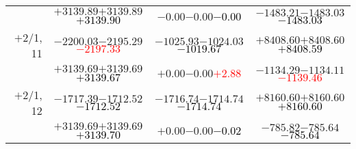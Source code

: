 \documentclass[compress]{beamer}
\begin{document}
\begin{frame}
{\begin{tabular}{r | c | c | c}
           & $+3139.89$\hspace{0.1 cm}$+3139.89$\hspace{0.1 cm}\textcolor{black}{$+3139.90$} & $-0.00$\hspace{0.1 cm}$-0.00$\hspace{0.1 cm}\textcolor{black}{$-0.00$} & $-1483.21$\hspace{0.1 cm}$-1483.03$\hspace{0.1 cm}\textcolor{black}{$-1483.03$} \\
$+$2/1, 11 & $-2200.03$\hspace{0.1 cm}$-2195.29$\hspace{0.1 cm}\textcolor{red}{$-2197.33$} & $-1025.93$\hspace{0.1 cm}$-1024.03$\hspace{0.1 cm}\textcolor{black}{$-1019.67$} & $+8408.60$\hspace{0.1 cm}$+8408.60$\hspace{0.1 cm}\textcolor{black}{$+8408.59$} \\
           & $+3139.69$\hspace{0.1 cm}$+3139.69$\hspace{0.1 cm}\textcolor{black}{$+3139.67$} & $+0.00$\hspace{0.1 cm}$-0.00$\hspace{0.1 cm}\textcolor{red}{$+2.88$} & $-1134.29$\hspace{0.1 cm}$-1134.11$\hspace{0.1 cm}\textcolor{red}{$-1139.46$} \\
$+$2/1, 12 & $-1717.39$\hspace{0.1 cm}$-1712.52$\hspace{0.1 cm}\textcolor{black}{$-1712.52$} & $-1716.74$\hspace{0.1 cm}$-1714.74$\hspace{0.1 cm}\textcolor{black}{$-1714.74$} & $+8160.60$\hspace{0.1 cm}$+8160.60$\hspace{0.1 cm}\textcolor{black}{$+8160.60$} \\
           & $+3139.69$\hspace{0.1 cm}$+3139.69$\hspace{0.1 cm}\textcolor{black}{$+3139.70$} & $+0.00$\hspace{0.1 cm}$-0.00$\hspace{0.1 cm}\textcolor{black}{$-0.02$} & $-785.82$\hspace{0.1 cm}$-785.64$\hspace{0.1 cm}\textcolor{black}{$-785.64$} \\
\end{tabular}}
\end{frame}
\end{document}
